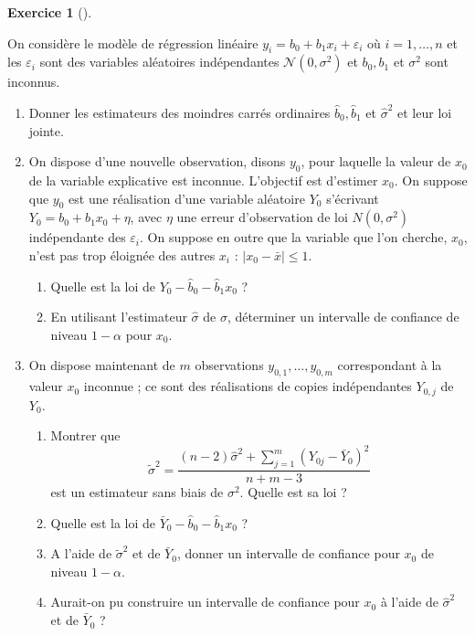 \documentclass[
  10,
  letterpaper,
  DIV=11,
  numbers=noendperiod]{scrreport}
\providecommand{\tightlist}{%
  \setlength{\itemsep}{0pt}\setlength{\parskip}{0pt}}\usepackage{longtable,booktabs,array}
\theoremstyle{plain}
\theoremstyle{definition}
\newtheorem{exercise}{Exercice}[chapter]
\theoremstyle{plain}
\theoremstyle{definition}
\theoremstyle{definition}
\theoremstyle{plain}
\theoremstyle{remark}
\begin{document}
\begin{exercise}[]\protect\hypertarget{exr-prediction}{}\label{exr-prediction}

On considère le modèle de régression linéaire
\(y_i=b_0+b_1x_i+\varepsilon_i\) où \(i = 1, \dotsc, n\) et les
\(\varepsilon_i\) sont des variables aléatoires indépendantes
\({\mathcal N}(0,\sigma^2)\) et \(b_0,b_1\) et \(\sigma^2\) sont
inconnus.

\begin{enumerate}
\def\labelenumi{\arabic{enumi}.}
\tightlist
\item
  Donner les estimateurs des moindres carrés ordinaires
  \(\hat{b}_0,\hat{b}_1\) et \(\hat{\sigma}^2\) et leur loi jointe.
\item
  On dispose d'une nouvelle observation, disons \(y_0\), pour laquelle
  la valeur de \(x_0\) de la variable explicative est inconnue.
  L'objectif est d'estimer \(x_0\). On suppose que \(y_0\) est une
  réalisation d'une variable aléatoire \(Y_0\) s'écrivant
  \(Y_0=b_0+b_1x_0+\eta\), avec \(\eta\) une erreur d'observation de loi
  \(N(0,\sigma^2)\) indépendante des \(\varepsilon_i\). On suppose en
  outre que la variable que l'on cherche, \(x_0\), n'est pas trop
  éloignée des autres \(x_i\) : \(|x_0- \bar x| \leq 1\).

  \begin{enumerate}
  \def\labelenumii{\roman{enumii})}
  \tightlist
  \item
    Quelle est la loi de \(Y_0-\hat{b}_0-\hat{b}_1x_0\) ?
  \item
    En utilisant l'estimateur \(\hat{\sigma}\) de \({\sigma}\),
    déterminer un intervalle de confiance de niveau \(1-\alpha\) pour
    \(x_0\).
  \end{enumerate}
\item
  On dispose maintenant de \(m\) observations \(y_{0,1},\dots,y_{0,m}\)
  correspondant à la valeur \(x_0\) inconnue ; ce sont des réalisations
  de copies indépendantes \(Y_{0,j}\) de \(Y_0\).

  \begin{enumerate}
  \def\labelenumii{\roman{enumii})}
  \tightlist
  \item
    Montrer que
    \[\tilde{\sigma}^2=\frac{(n-2)\hat{\sigma}^2+\sum_{j=1}^{m}(Y_{0j}-\bar{Y}_0)^2}{n+m-3}\]
    est un estimateur sans biais de \(\sigma^2\). Quelle est sa loi ?
  \item
    Quelle est la loi de \(\bar{Y}_0-\hat{b}_0-\hat{b}_1x_0\) ?
  \item
    A l'aide de \(\tilde{\sigma}^2\) et de \(\bar{Y}_0\), donner un
    intervalle de confiance pour \(x_0\) de niveau \(1-\alpha\).
  \item
    Aurait-on pu construire un intervalle de confiance pour \(x_0\) à
    l'aide de \(\hat{\sigma}^2\) et de \(\bar{Y}_0\) ?
  \end{enumerate}
\end{enumerate}

\end{exercise}
\end{document}
